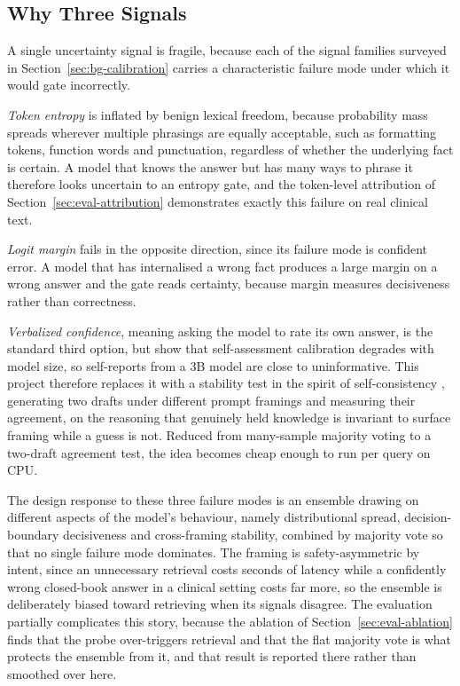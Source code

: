 \subsection{Why Three Signals}
\label{sec:method-why-three}

A single uncertainty signal is fragile, because each of the signal families
surveyed in Section~\ref{sec:bg-calibration} carries a characteristic
failure mode under which it would gate incorrectly.

\emph{Token entropy} is inflated by benign lexical freedom, because
probability mass spreads wherever multiple phrasings are equally acceptable,
such as formatting tokens, function words and punctuation, regardless of
whether the underlying fact is certain. A model that knows the answer but has
many ways to phrase it therefore looks uncertain to an entropy gate, and the
token-level attribution of Section~\ref{sec:eval-attribution} demonstrates
exactly this failure on real clinical text.

\emph{Logit margin} fails in the opposite direction, since its failure mode is
confident error. A model that has internalised a wrong fact produces a large
margin on a wrong answer and the gate reads certainty, because margin measures
decisiveness rather than correctness.

\emph{Verbalized confidence}, meaning asking the model to rate its own answer,
is the standard third option, but \citet{kadavath2022} show that
self-assessment calibration degrades with model size, so self-reports from a
3B model are close to uninformative. This project therefore replaces it with a
stability test in the spirit of self-consistency
\citep{wang2023selfconsistency}, generating two drafts under different prompt
framings and measuring their agreement, on the reasoning that genuinely held
knowledge is invariant to surface framing while a guess is not. Reduced from
many-sample majority voting to a two-draft agreement test, the idea becomes
cheap enough to run per query on CPU.

The design response to these three failure modes is an ensemble drawing on
different aspects of the model's behaviour, namely distributional spread,
decision-boundary decisiveness and cross-framing stability, combined by
majority vote so that no single failure mode dominates. The framing is
safety-asymmetric by intent, since an unnecessary retrieval costs seconds of
latency while a confidently wrong closed-book answer in a clinical setting
costs far more, so the ensemble is deliberately biased toward retrieving when
its signals disagree. The evaluation partially complicates this story, because
the ablation of Section~\ref{sec:eval-ablation} finds that the probe
over-triggers retrieval and that the flat majority vote is what protects the
ensemble from it, and that result is reported there rather than smoothed over
here.

